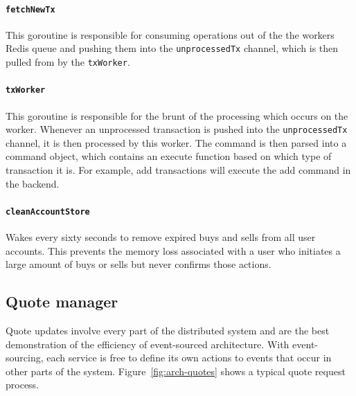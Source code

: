 \paragraph{\texttt{fetchNewTx}}
This goroutine is responsible for consuming operations out of the the workers Redis queue and pushing them into the \texttt{unprocessedTx} channel, which is then pulled from by the \texttt{txWorker}.

\paragraph{\texttt{txWorker}}
This goroutine is responsible for the brunt of the processing which occurs on the worker. Whenever an unprocessed transaction is pushed into the \texttt{unprocessedTx} channel, it is then processed by this worker. The command is then parsed into a command object, which contains an execute function based on which type of transaction it is. For example, add transactions will execute the add command in the backend.

\paragraph{\texttt{cleanAccountStore}}
Wakes every sixty seconds to remove expired buys and sells from all user accounts. This prevents the memory loss associated with a user who initiates a large amount of buys or sells but never confirms those actions.

\subsection{Quote manager}
Quote updates involve every part of the distributed system and are the best demonstration of the efficiency of event-sourced architecture. With event-sourcing, each service is free to define its own actions to events that occur in other parts of the system. Figure~\ref{fig:arch-quotes} shows a typical quote request process.


